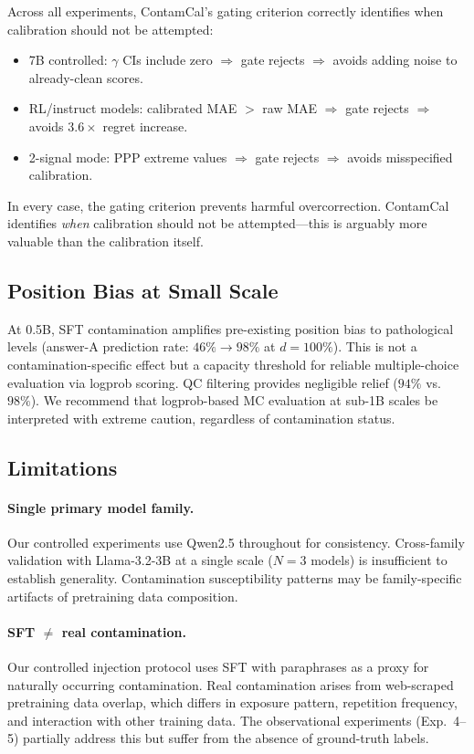 \documentclass[11pt,a4paper]{article}
\newcommand{\gam}{\gamma}
\begin{document}
Across all experiments, ContamCal's gating criterion correctly identifies when calibration should not be attempted:

\begin{itemize}
    \item 7B controlled: $\gam$ CIs include zero $\Rightarrow$ gate rejects $\Rightarrow$ avoids adding noise to already-clean scores.
    \item RL/instruct models: calibrated MAE $>$ raw MAE $\Rightarrow$ gate rejects $\Rightarrow$ avoids $3.6\times$ regret increase.
    \item 2-signal mode: PPP extreme values $\Rightarrow$ gate rejects $\Rightarrow$ avoids misspecified calibration.
\end{itemize}

In every case, the gating criterion prevents harmful overcorrection.
ContamCal identifies \emph{when} calibration should not be attempted---this is arguably more valuable than the calibration itself.

\subsection{Position Bias at Small Scale}

At 0.5B, SFT contamination amplifies pre-existing position bias to pathological levels (answer-A prediction rate: $46\% \to 98\%$ at $d = 100\%$).
This is not a contamination-specific effect but a capacity threshold for reliable multiple-choice evaluation via logprob scoring.
QC filtering provides negligible relief ($94\%$ vs.\ $98\%$).
We recommend that logprob-based MC evaluation at sub-1B scales be interpreted with extreme caution, regardless of contamination status.

\subsection{Limitations}

\paragraph{Single primary model family.}
Our controlled experiments use Qwen2.5 throughout for consistency. Cross-family validation with Llama-3.2-3B at a single scale ($N = 3$ models) is insufficient to establish generality. Contamination susceptibility patterns may be family-specific artifacts of pretraining data composition.

\paragraph{SFT $\neq$ real contamination.}
Our controlled injection protocol uses SFT with paraphrases as a proxy for naturally occurring contamination. Real contamination arises from web-scraped pretraining data overlap, which differs in exposure pattern, repetition frequency, and interaction with other training data. The observational experiments (Exp.~4--5) partially address this but suffer from the absence of ground-truth labels.
\end{document}
